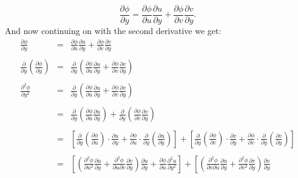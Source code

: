 \documentclass[10pt]{amsart}
\theoremstyle{nonumberplain}
\begin{document}
\begin{enumerate}[label={\bf {\arabic*}:}]
$$\frac{\partial\phi}{\partial y} = \frac{\partial\phi}{\partial u} \frac{\partial u}{\partial y} + \frac{\partial\phi}{\partial v} \frac{\partial v}{\partial y}.$$
And now continuing on with the second derivative we get:
\begin{eqnarray*}
\frac{\partial\phi}{\partial y} &=& \frac{\partial\phi}{\partial u} \frac{\partial u}{\partial y} + \frac{\partial\phi}{\partial v} \frac{\partial v}{\partial y} \\ \\
\frac{\partial}{\partial y} \left(\frac{\partial\phi}{\partial y}\right) &=& \frac{\partial}{\partial y} \left(\frac{\partial\phi}{\partial u} \frac{\partial u}{\partial y} + \frac{\partial\phi}{\partial v} \frac{\partial v}{\partial y}\right) \\ \\
\frac{\partial^2\phi}{\partial y^2} &=& \frac{\partial}{\partial y} \left(\frac{\partial\phi}{\partial u} \frac{\partial u}{\partial y} + \frac{\partial\phi}{\partial v} \frac{\partial v}{\partial y}\right) \\ \\
						&=& \frac{\partial}{\partial y} \left(\frac{\partial\phi}{\partial u} \frac{\partial u}{\partial y}\right)
							+ \frac{\partial}{\partial y}  \left(\frac{\partial\phi}{\partial v} \frac{\partial v}{\partial y}\right) \\ \\
						&=& \left[ 
							\frac{\partial}{\partial y} \left( \frac{\partial\phi}{\partial u} \right) \cdot \frac{\partial u}{\partial y}
							+ \frac{\partial\phi}{\partial u} \cdot \frac{\partial}{\partial y} \left(\frac{\partial u}{\partial y} \right)
						\right] 
							+ \left[ 
							\frac{\partial}{\partial y} \left( \frac{\partial\phi}{\partial v} \right) \cdot \frac{\partial v}{\partial y}
							+ \frac{\partial\phi}{\partial v} \cdot \frac{\partial}{\partial y} \left(\frac{\partial v}{\partial y} \right)
						\right] \\ \\
						&=& \left[ 
							\left( \frac{\partial^2 \phi}{\partial u^2} \frac{\partial u}{\partial y} + \frac{\partial^2 \phi}{\partial u \partial v} \frac{\partial v}{\partial y} \right) \frac{\partial u}{\partial y}
							+ \frac{\partial\phi}{\partial u} \frac{\partial^2 u}{\partial y^2}
						\right] 
							+ \left[ 
							\left( \frac{\partial^2 \phi}{\partial v \partial u} \frac{\partial u}{\partial y} + \frac{\partial^2 \phi}{\partial v^2} \frac{\partial v}{\partial y} \right) \frac{\partial v}{\partial y}

\end{eqnarray*}
\end{enumerate}
\end{document}
